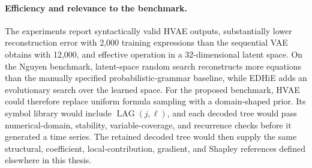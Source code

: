 \paragraph{Efficiency and relevance to the benchmark.}
The experiments report syntactically valid HVAE outputs, substantially lower
reconstruction error with 2,000 training expressions than the sequential VAE
obtains with 12,000, and effective operation in a 32-dimensional latent space.
On the Nguyen benchmark, latent-space random search reconstructs more equations
than the manually specified probabilistic-grammar baseline, while EDHiE adds an
evolutionary search over the learned space. For the proposed benchmark, HVAE
could therefore replace uniform formula sampling with a domain-shaped prior.
Its symbol library would include $\operatorname{LAG}(j,\ell)$, and each decoded
tree would pass numerical-domain, stability, variable-coverage, and recurrence
checks before it generated a time series. The retained decoded tree would then
supply the same structural, coefficient, local-contribution, gradient, and
Shapley references defined elsewhere in this thesis.

